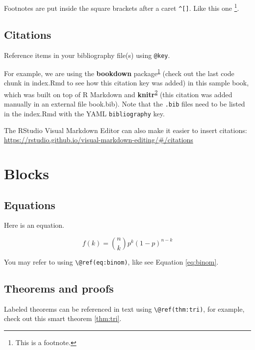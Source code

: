 \documentclass[
]{book}
\theoremstyle{definition}
\theoremstyle{definition}
\theoremstyle{definition}
\theoremstyle{definition}
\theoremstyle{remark}
\begin{document}
Footnotes are put inside the square brackets after a caret \texttt{\^{}{[}{]}}. Like this one \footnote{This is a footnote.}.

\hypertarget{citations}{%
\subsection{Citations}\label{citations}}

Reference items in your bibliography file(s) using \texttt{@key}.

For example, we are using the \textbf{bookdown} package\textsuperscript{\protect\hyperlink{ref-R-bookdown}{1}} (check out the last code chunk in index.Rmd to see how this citation key was added) in this sample book, which was built on top of R Markdown and \textbf{knitr}\textsuperscript{\protect\hyperlink{ref-xie2015}{2}} (this citation was added manually in an external file book.bib).
Note that the \texttt{.bib} files need to be listed in the index.Rmd with the YAML \texttt{bibliography} key.

The RStudio Visual Markdown Editor can also make it easier to insert citations: \url{https://rstudio.github.io/visual-markdown-editing/\#/citations}

\hypertarget{blocks}{%
\section{Blocks}\label{blocks}}

\hypertarget{equations}{%
\subsection{Equations}\label{equations}}

Here is an equation.

\begin{equation} 
  f\left(k\right) = \binom{n}{k} p^k\left(1-p\right)^{n-k}
  \label{eq:binom}
\end{equation}

You may refer to using \texttt{\textbackslash{}@ref(eq:binom)}, like see Equation \eqref{eq:binom}.

\hypertarget{theorems-and-proofs}{%
\subsection{Theorems and proofs}\label{theorems-and-proofs}}

Labeled theorems can be referenced in text using \texttt{\textbackslash{}@ref(thm:tri)}, for example, check out this smart theorem \ref{thm:tri}.
\end{document}

